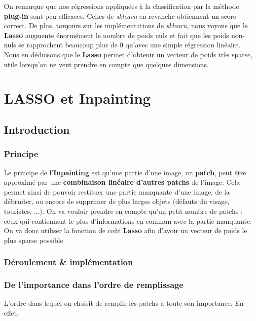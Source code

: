\documentclass[a4paper]{memoir}
\begin{document}
On remarque que nos régressions appliquées à la classification par la méthode \textbf{plug-in} sont peu efficaces. Celles de \textit{sklearn} en revanche obtiennent un score correct. De plus, toujours sur les implémentations de \textit{sklearn}, nous voyons que le \textbf{Lasso} augmente énormément le nombre de poids nuls et fait que les poids non-nuls se rapprochent beaucoup plus de $0$ qu'avec une simple régression linéaire. Nous en déduisons que le \textbf{Lasso} permet d'obtenir un vecteur de poids très sparse, utile lorsqu'on ne veut prendre en compte que quelques dimensions.


\section{LASSO et Inpainting}
\subsection{Introduction}
\subsubsection{Principe}
Le principe de l'\textbf{Inpainting} est qu'une partie d'une image, un \textbf{patch}, peut être approximé par une \textbf{combinaison linéaire d'autres patchs} de l'image. Cela permet ainsi de pouvoir restituer une partie manquante d'une image, de la débruiter, ou encore de supprimer de plus larges objets (défauts du visage, touristes, $\ldots$). On va vouloir prendre en compte qu'un petit nombre de patchs : ceux qui contiennent le plus d'informations en commun avec la partie manquante. On va donc utiliser la fonction de coût \textbf{Lasso} afin d'avoir un vecteur de poids le plus sparse possible.


\subsubsection{Déroulement \& implémentation}



\subsubsection{De l'importance dans l'ordre de remplissage}
L'ordre dans lequel on choisit de remplir les patchs à toute son importance. En effet, 
\end{document}
